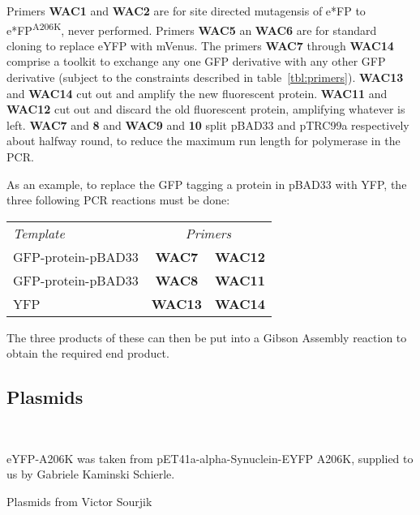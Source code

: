 \documentclass[../main.tex]{subfiles}
\begin{document}
Primers \textbf{WAC1} and \textbf{WAC2} are for site directed mutagensis of e*FP to e*FP\textsuperscript{A206K}, never performed. Primers \textbf{WAC5} an \textbf{WAC6} are for standard cloning to replace eYFP with mVenus. The primers \textbf{WAC7} through \textbf{WAC14} comprise a toolkit to exchange any one GFP derivative with any other GFP derivative (subject to the constraints described in table~\ref{tbl:primers}). \textbf{WAC13} and \textbf{WAC14} cut out and amplify the new fluorescent protein. \textbf{WAC11} and \textbf{WAC12} cut out and discard the old fluorescent protein, amplifying whatever is left. \textbf{WAC7} and \textbf{8} and \textbf{WAC9} and \textbf{10} split pBAD33 and pTRC99a respectively about halfway round, to reduce the maximum run length for polymerase in the PCR.

As an example, to replace the GFP tagging a protein in pBAD33 with YFP, the three following PCR reactions must be done:
\begin{center}
\begin{tabular}{lcc}
\textit{Template}&\multicolumn{2}{c}{\textit{Primers}} \\
GFP-protein-pBAD33	&	\textbf{WAC7} 	&	\textbf{WAC12}\\
GFP-protein-pBAD33	&	\textbf{WAC8} 	&	\textbf{WAC11}\\
YFP					&	\textbf{WAC13}	&	\textbf{WAC14}
\end{tabular}
\end{center}


The three products of these can then be put into a Gibson Assembly reaction to obtain the required end product.
\subsection{Plasmids}
\label{sec:plaspri:plas}
~

eYFP-A206K was taken from pET41a-alpha-Synuclein-EYFP A206K, supplied to us by Gabriele Kaminski Schierle.

\begin{table}[h!]
\begin{center}
\caption[Plasmids (Victor Sourjik)]{Plasmids from Victor Sourjik~\citep{sourjik00, kentner09}}
\label{tbl:vsplasmids}
\end{center}
\end{table}
\end{document}
